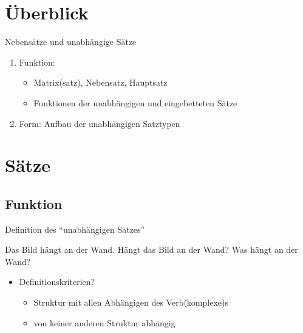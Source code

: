 

\section{Überblick}

\begin{frame}
  {Nebensätze und unabhängige Sätze}
  \pause
  \begin{enumerate}[<+->]
    \item \alert{Funktion}:
    \begin{itemize}[<+->]
      \item Matrix(satz), Nebensatz, Hauptsatz
      \item Funktionen der unabhängigen und eingebetteten Sätze 
    \end{itemize}
    \Zeile
    \item \alert{Form}: Aufbau der unabhängigen Satztypen
  \end{enumerate}
\end{frame}




\section{Sätze}

\subsection{Funktion}

\begin{frame}
  {Definition des "`unabhängigen Satzes"'}
  \pause
  \begin{exe}
    \ex Das Bild hängt an der Wand.
    \pause
    \ex Hängt das Bild an der Wand?
    \pause
    \ex Was hängt an der Wand?
  \end{exe}
  \pause
  \begin{itemize}[<+->]
    \item Definitionskriterien?
      \begin{itemize}[<+->]
        \item Struktur mit \alert{allen Abhängigen} des Verb(komplexe)s
        \item \alert{von keiner anderen Struktur abhängig}
      \end{itemize}
  \end{itemize}
\end{frame}

